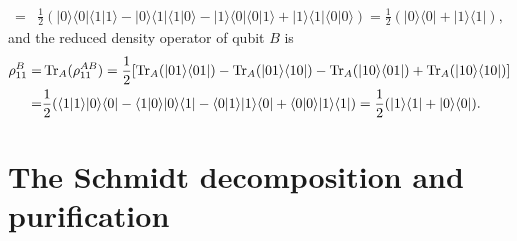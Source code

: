 \documentclass[en]{sol-man}
\begin{document}
\begin{sol}
\begin{align}
        =&\frac{1}{2}(\lvert 0\rangle\langle 0\rvert\langle 1\vert 1\rangle-\lvert 0\rangle\langle 1\rvert\langle 1\vert 0\rangle-\lvert 1\rangle\langle 0\rvert\langle 0\vert 1\rangle+\lvert 1\rangle\langle 1\rvert\langle 0\vert 0\rangle)=\frac{1}{2}(\lvert 0\rangle\langle 0\rvert+\lvert 1\rangle\langle 1\rvert),
    \end{align}
    and the reduced density operator of qubit $B$ is
    \begin{align}
        \notag\rho_{11}^B=&\operatorname{Tr}_A(\rho_{11}^{AB})=\frac{1}{2}[\operatorname{Tr}_A(\lvert 01\rangle\langle 01\rvert)-\operatorname{Tr}_A(\lvert 01\rangle\langle 10\rvert)-\operatorname{Tr}_A(\lvert 10\rangle\langle 01\rvert)+\operatorname{Tr}_A(\lvert 10\rangle\langle 10\rvert)]\\
        =&\frac{1}{2}(\langle 1\vert 1\rangle\lvert 0\rangle\langle 0\rvert-\langle 1\vert 0\rangle\lvert 0\rangle\langle 1\rvert-\langle 0\vert 1\rangle\lvert 1\rangle\langle 0\rvert+\langle 0\vert 0\rangle\lvert 1\rangle\langle 1\rvert)=\frac{1}{2}(\lvert 1\rangle\langle 1\rvert+\lvert 0\rangle\langle 0\rvert).
    \end{align}
\end{sol}

\section{The Schmidt decomposition and purification}
\end{document}
